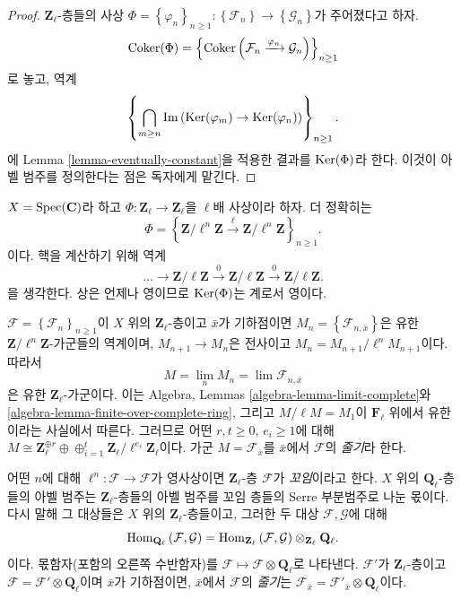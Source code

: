 \begin{proof}
$\mathbf{Z}_\ell$-층들의 사상
$\Phi = \left\{\varphi_n\right\}_{n\geq 1} :
\left\{\mathcal{F}_n\right\}
\to
\left\{\mathcal{G}_n\right\}$가 주어졌다고 하자.
$$
\mathop{\mathrm{Coker}}(\Phi) =
\left\{
\mathop{\mathrm{Coker}}\left(\mathcal{F}_n \xrightarrow{\varphi_n} \mathcal{G}_n\right)
\right\}_{n\geq 1}
$$
로 놓고, 역계
$$
\left\{
\bigcap_{m\geq n}
\mathop{\mathrm{Im}}\left(\mathop{\mathrm{Ker}}(\varphi_m) \to \mathop{\mathrm{Ker}}(\varphi_n)\right)
\right\}_{n \geq 1}.
$$
에 Lemma \ref{lemma-eventually-constant}을 적용한 결과를
$\mathop{\mathrm{Ker}}(\Phi)$라 한다. 이것이 아벨 범주를 정의한다는 점은 독자에게
맡긴다.
\end{proof}

\begin{example}
\label{example-kernel}
$X=\mathop{\mathrm{Spec}}(\mathbf{C})$라 하고
$\Phi : \mathbf{Z}_\ell\to \mathbf{Z}_\ell$을 $\ell$배 사상이라 하자.
더 정확히는
$$
\Phi = \left\{ \mathbf{Z}/\ell^n\mathbf{Z} \xrightarrow{\ell}
\mathbf{Z}/\ell^n\mathbf{Z}\right\}_{n \geq 1}.
$$
이다. 핵을 계산하기 위해 역계
$$
\ldots\to \mathbf{Z}/\ell\mathbf{Z}\xrightarrow{0}
\mathbf{Z}/\ell\mathbf{Z}\xrightarrow{0}\mathbf{Z}/\ell\mathbf{Z}.
$$
을 생각한다. 상은 언제나 영이므로 $\mathop{\mathrm{Ker}}(\Phi)$는 계로서 영이다.
\end{example}

\begin{remark}
\label{remark-stalk-l-adic-sheaf}
$\mathcal{F} = \left\{\mathcal{F}_n\right\}_{n\geq 1}$이 $X$ 위의
$\mathbf{Z}_\ell$-층이고 $\bar x$가 기하점이면
$M_n = \left\{\mathcal{F}_{n, \bar x}\right\}$은 유한
$\mathbf{Z}/\ell^n\mathbf{Z}$-가군들의 역계이며,
$M_{n+1}\to M_n$은 전사이고
$M_n = M_{n+1}/\ell^n M_{n+1}$이다. 따라서
$$
M = \lim_n M_n = \lim \mathcal{F}_{n, \bar x}
$$
은 유한 $\mathbf{Z}_\ell$-가군이다. 이는 Algebra, Lemmas
\ref{algebra-lemma-limit-complete}와
\ref{algebra-lemma-finite-over-complete-ring}, 그리고
$M/\ell M = M_1$이 $\mathbf{F}_\ell$ 위에서 유한이라는 사실에서
따른다. 그러므로 어떤 $r, t\geq 0$, $e_i\geq 1$에 대해
$M\cong \mathbf{Z}_\ell^{\oplus r} \oplus \oplus_{i = 1}^t
\mathbf{Z}_\ell/\ell^{e_i}\mathbf{Z}_\ell$이다.
가군 $M = \mathcal{F}_{\bar x}$를 $\bar x$에서 $\mathcal{F}$의
{\it 줄기}라 한다.
\end{remark}

\begin{definition}
\label{definition-torsion-l-adic-sheaf}
어떤 $n$에 대해 $\ell^n : \mathcal{F} \to \mathcal{F}$가 영사상이면
$\mathbf{Z}_\ell$-층 $\mathcal{F}$가 {\it 꼬임}이라고 한다.
$X$ 위의 $\mathbf{Q}_\ell$-층들의 아벨 범주는
$\mathbf{Z}_\ell$-층들의 아벨 범주를 꼬임 층들의 Serre 부분범주로
나눈 몫이다. 다시 말해 그 대상들은 $X$ 위의
$\mathbf{Z}_\ell$-층들이고, 그러한 두 대상
$\mathcal{F}, \mathcal{G}$에 대해
$$
\mathop{\mathrm{Hom}}\nolimits_{\mathbf{Q}_\ell} \left(\mathcal{F}, \mathcal{G} \right) =
\mathop{\mathrm{Hom}}\nolimits_{\mathbf{Z}_\ell} \left(\mathcal{F}, \mathcal{G}\right)
\otimes_{\mathbf{Z}_\ell} \mathbf{Q}_\ell.
$$
이다. 몫함자(포함의 오른쪽 수반함자)를
$\mathcal{F} \mapsto \mathcal{F} \otimes \mathbf{Q}_\ell$로 나타낸다.
$\mathcal{F}'$가 $\mathbf{Z}_\ell$-층이고
$\mathcal{F} = \mathcal{F}' \otimes \mathbf{Q}_\ell$이며 $\bar x$가
기하점이면, $\bar x$에서 $\mathcal{F}$의 {\it 줄기}는
$\mathcal{F}_{\bar x} =
\mathcal{F}'_{\bar x} \otimes \mathbf{Q}_\ell$이다.
\end{definition}

